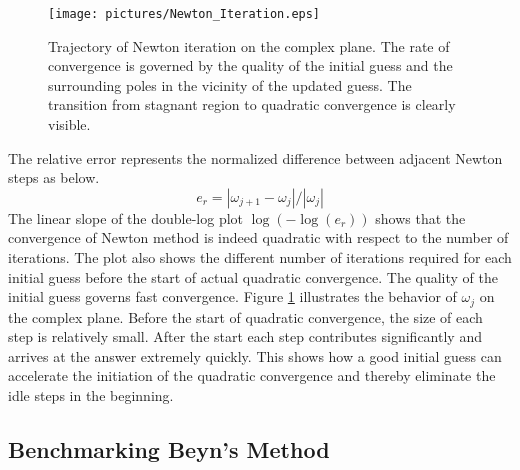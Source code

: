 \documentclass[final,leqno,onefignum,onetabnum]{siamltex1213}
\begin{document}
\begin{figure}\label{fig:NewtonIterate}
\begin{center}
\texttt{[image: pictures/Newton\_Iteration.eps]}
\end{center}
\caption{Trajectory of Newton iteration on the complex plane. \textnormal{The rate of convergence is governed by the quality of the initial guess and the surrounding poles in the vicinity of the updated guess. The transition from stagnant region to quadratic convergence is clearly visible.}} 
\end{figure}
The relative error represents the normalized difference between adjacent Newton steps as below.
\begin{equation}\label{eq:er}
e_r=|\omega_{j+1} - \omega_j|/|\omega_j|
\end{equation}
The linear slope of the double-log plot $\log(-\log(e_r))$ shows that the convergence of Newton method is indeed quadratic with respect to the number of iterations. The plot also shows the different number of iterations required for each initial guess before the start of actual quadratic convergence. The quality of the initial guess governs fast convergence. Figure \ref{fig:NewtonIterate} illustrates the behavior of $\omega_j$ on the complex plane. Before the start of quadratic convergence, the size of each step is relatively small. After the start each step contributes significantly and arrives at the answer extremely quickly. This shows how a good initial guess can accelerate the initiation of the quadratic convergence and thereby eliminate the idle steps in the beginning. 
\subsection{Benchmarking Beyn's Method}
\end{document}
